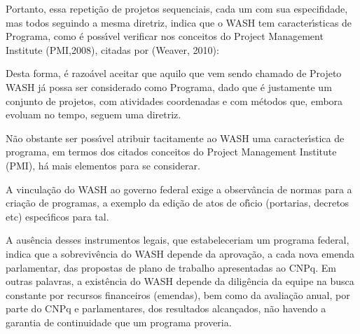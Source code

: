 \documentclass[
12pt,		%
openright,	%
twoside,  %
a4paper,			%
chapter=TITLE,		%
english,			%
french,				%
spanish,			%
brazil				%
]{USPSC-classe/USPSC}
\begin{document}
Portanto, essa repeti\c{c}\~ao de projetos sequenciais, cada um com sua especifidade, mas todos seguindo a mesma diretriz, indica que o WASH tem caracter\'{\i}sticas de Programa, como \'e poss\'{\i}vel verificar nos conceitos do Project Management Institute  (PMI,2008), citadas por  (Weaver, 2010):










\noindent\begin{center}\mbox{\centering{}}\end{center}


Desta forma, \'e razo\'avel aceitar que aquilo que vem sendo chamado de Projeto WASH j\'a possa ser considerado como Programa, dado que \'e justamente um conjunto de projetos, com atividades coordenadas e com m\'etodos que, embora evoluam no tempo, seguem uma diretriz.









N\~ao obstante ser poss\'{\i}vel atribuir tacitamente ao WASH uma caracter\'{\i}stica de programa, em termos dos citados conceitos do Project Management Institute (PMI), h\'a mais elementos para se considerar.









A vincula\c{c}\~ao do WASH ao governo federal exige a observ\^ancia de normas para a cria\c{c}\~ao de programas, a exemplo da edi\c{c}\~ao de atos de of\'{\i}cio (portarias, decretos etc) espec\'{\i}ficos para tal.









A aus\^encia desses instrumentos legais, que estabeleceriam um \textquotedbl programa federal\textquotedbl , indica que a sobreviv\^encia do WASH depende da aprova\c{c}\~ao, a cada nova emenda parlamentar, das propostas de plano de trabalho apresentadas ao CNPq. Em outras palavras, a exist\^encia do WASH depende da dilig\^encia da equipe na busca constante por recursos financeiros (emendas), bem como da avalia\c{c}\~ao anual, por parte do CNPq e parlamentares, dos resultados alcan\c{c}ados, n\~ao havendo a garantia de continuidade que um programa proveria.
\end{document}

